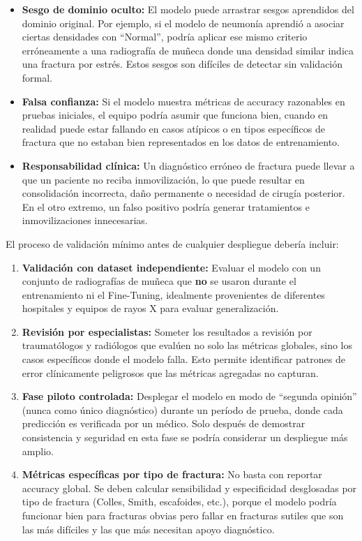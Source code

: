 \documentclass[12pt, letterpaper]{article}
\begin{document}
\begin{itemize}[leftmargin=1.5cm]
    \item \textbf{Sesgo de dominio oculto:} El modelo puede arrastrar sesgos aprendidos del
    dominio original. Por ejemplo, si el modelo de neumonía aprendió a asociar ciertas
    densidades con ``Normal'', podría aplicar ese mismo criterio erróneamente a una radiografía
    de muñeca donde una densidad similar indica una fractura por estrés. Estos sesgos son
    difíciles de detectar sin validación formal.

    \item \textbf{Falsa confianza:} Si el modelo muestra métricas de accuracy razonables en
    pruebas iniciales, el equipo podría asumir que funciona bien, cuando en realidad puede
    estar fallando en casos atípicos o en tipos específicos de fractura que no estaban bien
    representados en los datos de entrenamiento.

    \item \textbf{Responsabilidad clínica:} Un diagnóstico erróneo de fractura puede llevar a
    que un paciente no reciba inmovilización, lo que puede resultar en consolidación incorrecta,
    daño permanente o necesidad de cirugía posterior. En el otro extremo, un falso positivo
    podría generar tratamientos e inmovilizaciones innecesarias.
\end{itemize}

El proceso de validación mínimo antes de cualquier despliegue debería incluir:

\begin{enumerate}[leftmargin=1.5cm]
    \item \textbf{Validación con dataset independiente:} Evaluar el modelo con un conjunto de
    radiografías de muñeca que \textbf{no} se usaron durante el entrenamiento ni el Fine-Tuning,
    idealmente provenientes de diferentes hospitales y equipos de rayos X para evaluar
    generalización.

    \item \textbf{Revisión por especialistas:} Someter los resultados a revisión por
    traumatólogos y radiólogos que evalúen no solo las métricas globales, sino los casos
    específicos donde el modelo falla. Esto permite identificar patrones de error
    clínicamente peligrosos que las métricas agregadas no capturan.

    \item \textbf{Fase piloto controlada:} Desplegar el modelo en modo de ``segunda opinión''
    (nunca como único diagnóstico) durante un período de prueba, donde cada predicción es
    verificada por un médico. Solo después de demostrar consistencia y seguridad en esta fase
    se podría considerar un despliegue más amplio.

    \item \textbf{Métricas específicas por tipo de fractura:} No basta con reportar accuracy
    global. Se deben calcular sensibilidad y especificidad desglosadas por tipo de fractura
    (Colles, Smith, escafoides, etc.), porque el modelo podría funcionar bien para fracturas
    obvias pero fallar en fracturas sutiles que son las más difíciles y las que más necesitan
    apoyo diagnóstico.
\end{enumerate}
\end{document}
